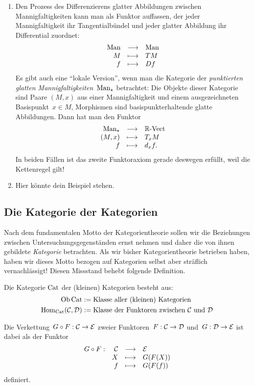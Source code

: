 \begin{enumerate}
\item Den Prozess des Differenzierens glatter Abbildungen zwischen
Mannigfaltigkeiten kann man als Funktor auffassen, der jeder Mannigfaltigkeit
ihr Tangentialbündel und jeder glatter Abbildung ihr Differential zuordnet:
\[ \begin{array}{@{}rcl@{}}
  \Man &\longrightarrow& \Man \\
  M &\longmapsto& TM \\
  f &\longmapsto& Df
\end{array} \]
Es gibt auch eine "`lokale Version"', wenn man die Kategorie der
\emph{punktierten glatten Mannigfaltigkeiten}~$\mathrm{Man}_\star$ betrachtet: Die
Objekte dieser Kategorie sind Paare $(M,x)$ aus einer Mannigfaltigkeit und
einem ausgezeichneten Basispunkt~$x \in M$, Morphismen sind
basispunkterhaltende glatte Abbildungen. Dann hat man den Funktor
\[ \begin{array}{@{}rcl@{}}
  \Man_\star &\longrightarrow& \Vect{\RR} \\
  (M,x) &\longmapsto& T_x M \\
  f &\longmapsto& d_x f.
\end{array} \]
In beiden Fällen ist das zweite Funktoraxiom gerade deswegen erfüllt, weil die
Kettenregel gilt!

\item Hier könnte dein Beispiel stehen.
\end{enumerate}


\subsection{Die Kategorie der Kategorien}

Nach dem fundamentalen Motto der Kategorientheorie sollen wir die Beziehungen
zwischen Untersuchungsgegenständen ernst nehmen und daher die von ihnen
gebildete \emph{Kategorie} betrachten. Als wir bisher Kategorientheorie
betrieben haben, haben wir dieses Motto bezogen auf Kategorien selbst aber
sträflich vernachlässigt! Diesen Missstand behebt folgende Definition.
\begin{defn}
Die Kategorie $\mathrm{Cat}$ der (kleinen) Kategorien besteht aus:
\begin{align*}
  \operatorname{Ob} \mathrm{Cat} &:= \text{Klasse aller (kleinen) Kategorien} \\
  \mathrm{Hom}_{\mathrm{Cat}}(\mathcal{C},\mathcal{D}) &:= \text{Klasse der Funktoren zwischen $\mathcal{C}$ und $\mathcal{D}$}
\end{align*}
\end{defn}
Die Verkettung~$G \circ F : \mathcal{C} \to \mathcal{E}$ zweier Funktoren~$F : \mathcal{C} \to \mathcal{D}$ und~$G
: \mathcal{D} \to \mathcal{E}$ ist dabei als der Funktor
\[ \begin{array}{@{}rrcl@{}}
  G \circ F: & \C &\longrightarrow& \E \\
  & X &\longmapsto& G(F(X)) \\
  & f &\longmapsto& G(F(f))
\end{array} \]
definiert.

